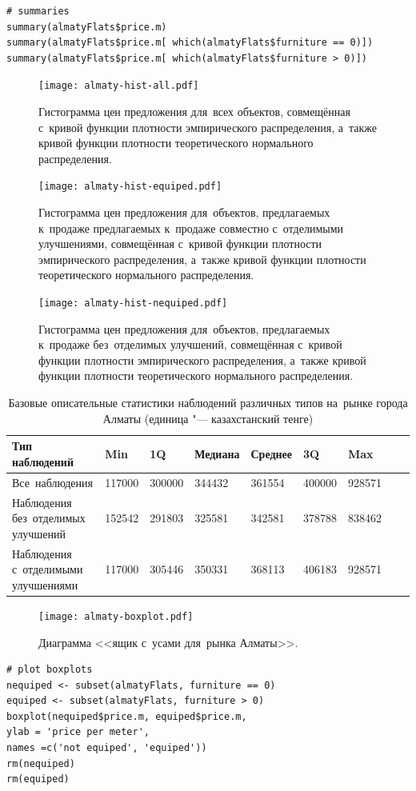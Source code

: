 \documentclass[]{scrreprt}
\begin{document}
%
\begin{lstlisting}[float, caption = Построение базовых описательных статистик для~наблюдений различных типов, firstnumber=1, label= lst:summaries-R]
# summaries
summary(almatyFlats$price.m)
summary(almatyFlats$price.m[ which(almatyFlats$furniture == 0)])
summary(almatyFlats$price.m[ which(almatyFlats$furniture > 0)])
\end{lstlisting}
%
\begin{figure}[ht]
	\centering
	\texttt{[image: almaty-hist-all.pdf]}
	\caption{Гистограмма цен предложения для~всех объектов, совмещённая с~кривой функции плотности эмпирического распределения, а~также кривой функции плотности теоретического нормального распределения.}
	\label{fig:almaty-hist-all-r}
\end{figure}
%
%
\begin{figure}[ht]
	\centering
	\texttt{[image: almaty-hist-equiped.pdf]}
	\caption{Гистограмма цен предложения для~объектов, предлагаемых к~продаже предлагаемых к~продаже совместно с~отделимыми улучшениями, совмещённая с~кривой функции плотности эмпирического распределения, а~также кривой функции плотности теоретического нормального распределения.}
	\label{fig:almaty-hist-equiped-r}
\end{figure}
%
%
\begin{figure}[ht]
	\centering
	\texttt{[image: almaty-hist-nequiped.pdf]}
	\caption{Гистограмма цен предложения для~объектов, предлагаемых к~продаже без~отделимых улучшений, совмещённая с~кривой функции плотности эмпирического распределения, а~также кривой функции плотности теоретического нормального распределения.}
	\label{fig:almaty-hist-nequiped-r}
\end{figure}
%
\begin{table}[ht]
	\caption{Базовые описательные статистики наблюдений различных типов на~рынке города Алматы (единица "--- казахстанский тенге)}\label{tab:summaries-almaty-R}
	\centering
	\begin{tabular}{lllllllll}
		\hline
		Тип наблюдений&Min&1Q&Медиана&Среднее&3Q&Max\\
		\hline
		Все~наблюдения&117000&300000&344432&361554&400000&928571\\
		\hline
		Наблюдения без~отделимых улучшений&152542&291803&325581&342581&378788&838462\\
		\hline
		Наблюдения с~отделимыми улучшениями&117000&305446&350331&368113&406183&928571\\
		\hline
	\end{tabular}
\end{table}
%
\begin{figure}[ht]
	\centering
	\texttt{[image: almaty-boxplot.pdf]}
	\caption{Диаграмма <<ящик с~усами для~рынка Алматы>>.}
	\label{fig:almaty-boxplot-r}
\end{figure}
%
\begin{lstlisting}[float, caption = Построение диграммы <<ящик с~усами>> для~рынка Алматы, firstnumber=1, label= lst:boxplot-R]
# plot boxplots
nequiped <- subset(almatyFlats, furniture == 0)
equiped <- subset(almatyFlats, furniture > 0)
boxplot(nequiped$price.m, equiped$price.m,
ylab = 'price per meter',
names =c('not equiped', 'equiped'))
rm(nequiped)
rm(equiped)
\end{lstlisting}
%
\end{document}
